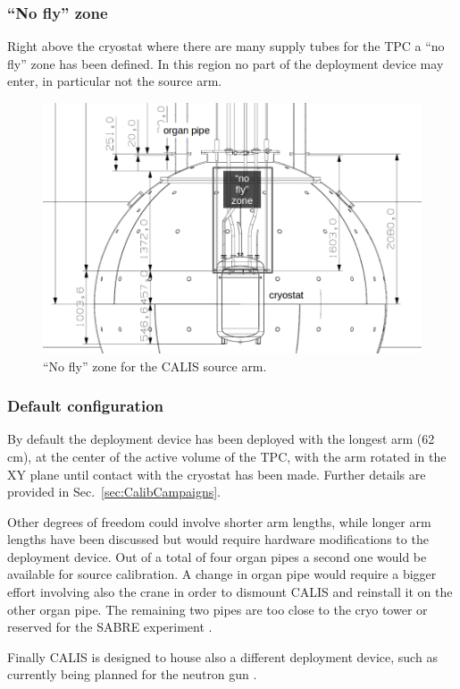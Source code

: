 \subsubsection{``No fly'' zone}
Right above the cryostat where there are many supply tubes for the TPC a ``no fly'' zone has been defined. In this region no part of the deployment device may enter, in particular not the source arm.

\begin{figure}[htbp]
 \centering
  \includegraphics[scale=0.5]{Figures/NoFlyZone.png}
  \caption{``No fly'' zone for the CALIS source arm.}
  \label{fig:NoFlyZone}
\end{figure} 

\subsubsection{Default configuration}
By default the deployment device has been deployed with the longest arm (62 cm), at the center of the active volume of the TPC, with the arm rotated in the XY plane until contact with the cryostat has been made. Further details are provided in Sec.~\ref{sec:CalibCampaigns}.

Other degrees of freedom could involve shorter arm lengths, while longer arm lengths have been discussed but would require hardware modifications to the deployment device. Out of a total of four organ pipes a second one would be available for source calibration. A change in organ pipe would require a bigger effort involving also the crane in order to dismount CALIS and reinstall it on the other organ pipe. The remaining two pipes are too close to the cryo tower or reserved for the SABRE experiment \cite{SABRE}.

Finally CALIS is designed to house also a different deployment device, such as currently being planned for the neutron gun \cite{???}.